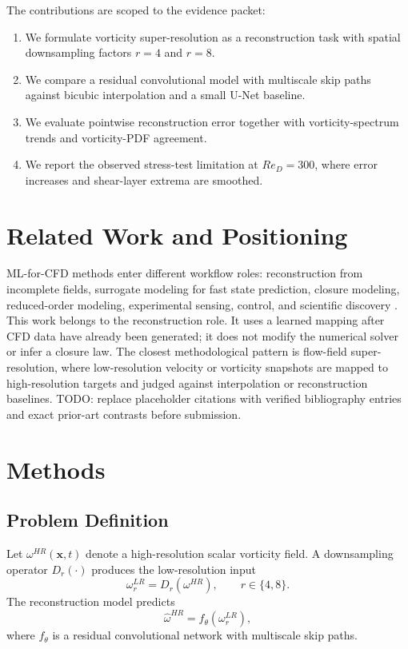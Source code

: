 \documentclass[11pt]{article}
\begin{document}
The contributions are scoped to the evidence packet:
\begin{enumerate}
    \item We formulate vorticity super-resolution as a reconstruction task with spatial downsampling factors $r=4$ and $r=8$.
    \item We compare a residual convolutional model with multiscale skip paths against bicubic interpolation and a small U-Net baseline.
    \item We evaluate pointwise reconstruction error together with vorticity-spectrum trends and vorticity-PDF agreement.
    \item We report the observed stress-test limitation at $Re_D=300$, where error increases and shear-layer extrema are smoothed.
\end{enumerate}

\section{Related Work and Positioning}
ML-for-CFD methods enter different workflow roles: reconstruction from incomplete fields, surrogate modeling for fast state prediction, closure modeling, reduced-order modeling, experimental sensing, control, and scientific discovery \cite{fukami2019superresolution,brunton2020mlfluid,vinuesa2022enhancing}. This work belongs to the reconstruction role. It uses a learned mapping after CFD data have already been generated; it does not modify the numerical solver or infer a closure law. The closest methodological pattern is flow-field super-resolution, where low-resolution velocity or vorticity snapshots are mapped to high-resolution targets and judged against interpolation or reconstruction baselines. TODO: replace placeholder citations with verified bibliography entries and exact prior-art contrasts before submission.

\section{Methods}
\subsection{Problem Definition}
Let $\omega^{HR}(\mathbf{x},t)$ denote a high-resolution scalar vorticity field. A downsampling operator $D_r(\cdot)$ produces the low-resolution input
\begin{equation}
    \omega^{LR}_r = D_r\left(\omega^{HR}\right), \qquad r \in \{4,8\}.
\end{equation}
The reconstruction model predicts
\begin{equation}
    \hat{\omega}^{HR} = f_\theta\left(\omega^{LR}_r\right),
\end{equation}
where $f_\theta$ is a residual convolutional network with multiscale skip paths.
\end{document}
